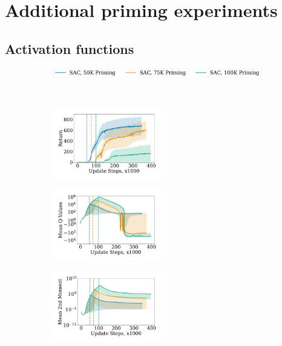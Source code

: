 \section{Additional priming experiments} \label{app:priming}

\subsection{Activation functions}

\begin{figure}[H]
\centering
    \begin{subfigure}[b]{0.8\textwidth}
        \centering
        \includegraphics[height=0.4cm]{figures/dissecting/priming/elu_priming_base_return_legend.pdf}
    \end{subfigure}\\%
    \begin{subfigure}[b]{0.33\textwidth}
        \centering
        \includegraphics[width=4.7cm, trim=1cm 1cm 1cm 1cm ,clip]{figures/dissecting/priming/elu_priming_base_return.pdf}
        \label{subfig:elu_priming_base_ret}
    \end{subfigure}%
    \begin{subfigure}[b]{0.33\textwidth}
    \centering
        \includegraphics[width=4.7cm, trim=1cm 1cm 1cm 1cm ,clip]{figures/dissecting/priming/elu_priming_base_Q.pdf}
        \label{subfig:priming_base_Q}
    \end{subfigure}%
    \begin{subfigure}[b]{0.33\textwidth}
        \centering
        \includegraphics[width=4.7cm, trim=1cm 1cm 1cm 1cm ,clip]{figures/dissecting/priming/elu_priming_base_exp_avg_sq.pdf}

\end{subfigure}
\end{figure}
